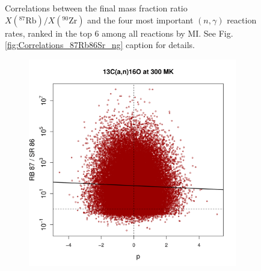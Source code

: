 \begin{figure}[t]
\begin{subfigure}[b]{0.495\textwidth}
\end{subfigure}
\caption{\label{fig:Correlations_87Rb90Zr_ng}Correlations between the final mass fraction ratio $X(^{87}\mathrm{Rb})/X(^{90}\mathrm{Zr})$ and the four most important $(n,\gamma)$ reaction rates, ranked in the top 6 among all reactions by MI. See Fig. \ref{fig:Correlations_87Rb86Sr_ng} caption for details.}
\end{figure}

\begin{figure}[t]
\centering
\begin{subfigure}[b]{0.495\textwidth}
\centering
\includegraphics[width=\textwidth]{Chapter-3/figs/CorrRB87SR86_13C_a_n_16O_300MK.png}  
\end{subfigure}
\hfill
\begin{subfigure}[b]{0.495\textwidth}  
\centering 

\end{subfigure}
\end{figure}
